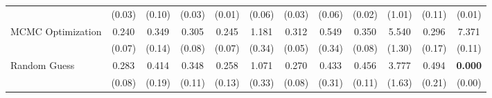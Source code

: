 \begin{table}[ht]
{\begin{tabular}{l cccc cccc cc c}
             & (0.03) & (0.10) & (0.03) & (0.01) & (0.06) & (0.03) & (0.06) & (0.02) & (1.01) & (0.11) & (0.01) \\
            \addlinespace[0.2em]
            MCMC Optimization & 0.240 & 0.349 & 0.305 & 0.245 & 1.181 & 0.312 & 0.549 & 0.350 & 5.540 & 0.296 & 7.371 \\
             & (0.07) & (0.14) & (0.08) & (0.07) & (0.34) & (0.05) & (0.34) & (0.08) & (1.30) & (0.17) & (0.11) \\
            \addlinespace[0.2em]
            Random Guess & 0.283 & 0.414 & 0.348 & 0.258 & 1.071 & 0.270 & 0.433 & 0.456 & 3.777 & 0.494 & \textbf{0.000} \\
             & (0.08) & (0.19) & (0.11) & (0.13) & (0.33) & (0.08) & (0.31) & (0.11) & (1.63) & (0.21) & (0.00) \\
            \bottomrule
        \end{tabular}%
    }
\end{table}